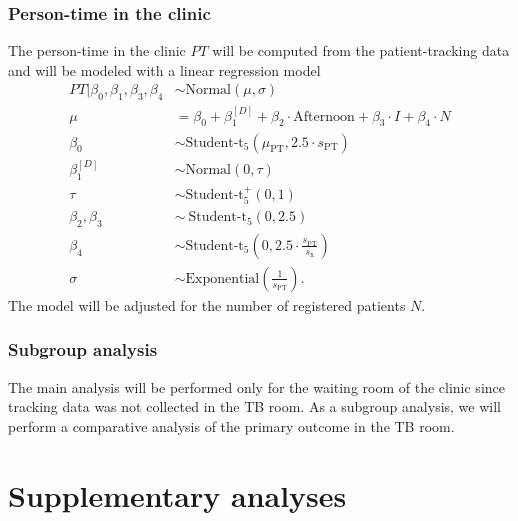 \documentclass{article}
\begin{document}
\subsubsection{Person-time in the clinic} 

The person-time in the clinic $PT$ will be computed from the patient-tracking data and will be modeled with a linear regression model 
\begin{align*}
    PT | \beta_0, \beta_1, \beta_3, \beta_4 &\sim \text{Normal}(\mu, \sigma) \\
    \mu &= \beta_0 + \beta_1^{[D]} + \beta_2 \cdot \text{Afternoon} + \beta_3 \cdot I + \beta_4 \cdot N \\
    \beta_0 &\sim \text{Student-t}_5(\mu_{\text{PT}}, 2.5\cdot s_{\text{PT}}) \\
    \beta_1^{[D]} &\sim \text{Normal}(0, \tau) \\
    \tau &\sim \text{Student-t}_5^{+}(0, 1) \\
    \beta_2, \beta_3 &\sim ~\text{Student-t}_5(0, 2.5) \\
    \beta_4 &\sim \text{Student-t}_5\left(0, 2.5\cdot \frac{s_{\text{PT}}}{s_{\text{x}}}\right) \\
    \sigma &\sim \text{Exponential}\left(\frac{1}{s_{\text{PT}}}\right).
\end{align*}
The model will be adjusted for the number of registered patients $N$.

\subsubsection{Subgroup analysis}

The main analysis will be performed only for the waiting room of the clinic since tracking data was not collected in the TB room. As a subgroup analysis, we will perform a comparative analysis of the primary outcome in the TB room. 

\section{Supplementary analyses}


\end{document}
